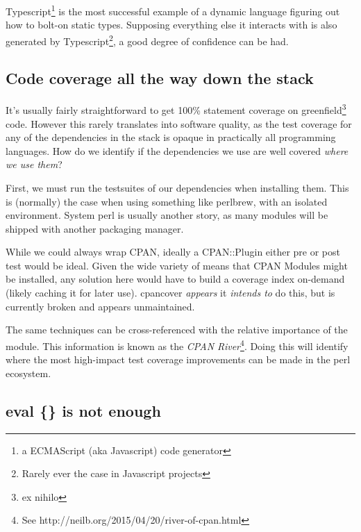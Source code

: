 \documentclass{article}
\begin{document}
Typescript\footnote{a ECMAScript (aka Javascript) code generator} is the most successful example of a dynamic language figuring out how to bolt-on static types.
Supposing everything else it interacts with is also generated by Typescript\footnote{Rarely ever the case in Javascript projects}, a good degree of confidence can be had.

\subsection{Code coverage all the way down the stack}

It's usually fairly straightforward to get 100\% statement coverage on greenfield\footnote{ex nihilo} code.
However this rarely translates into software quality, as the test coverage for any of the dependencies in the stack is opaque in practically all programming languages.
How do we identify if the dependencies we use are well covered \textit{where we use them}?

First, we must run the testsuites of our dependencies when installing them.
This is (normally) the case when using something like perlbrew, with an isolated environment.
System perl is usually another story, as many modules will be shipped with another packaging manager.

While we could always wrap CPAN, ideally a CPAN::Plugin either pre or post test would be ideal.
Given the wide variety of means that CPAN Modules might be installed, any solution here would have to build a coverage index on-demand (likely caching it for later use).
cpancover \textit{appears} it \textit{intends to} do this, but is currently broken and appears unmaintained.

The same techniques can be cross-referenced with the relative importance of the module.
This information is known as the \textit{CPAN River}\footnote{See http://neilb.org/2015/04/20/river-of-cpan.html}.
Doing this will identify where the most high-impact test coverage improvements can be made in the perl ecosystem.

\subsection{eval \{\} is not enough}
\end{document}
